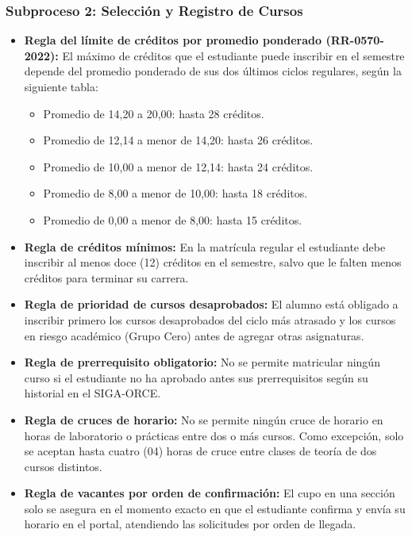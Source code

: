 \subsubsection{Subproceso 2: Selección y Registro de Cursos}

\begin{itemize}
    \item \textbf{Regla del límite de créditos por promedio ponderado (RR-0570-2022):} El máximo de créditos que el estudiante puede inscribir en el semestre depende del promedio ponderado de sus dos últimos ciclos regulares, según la siguiente tabla:
    \begin{itemize}
        \item Promedio de 14,20 a 20,00: hasta 28 créditos.
        \item Promedio de 12,14 a menor de 14,20: hasta 26 créditos.
        \item Promedio de 10,00 a menor de 12,14: hasta 24 créditos.
        \item Promedio de 8,00 a menor de 10,00: hasta 18 créditos.
        \item Promedio de 0,00 a menor de 8,00: hasta 15 créditos.
    \end{itemize}

    \item \textbf{Regla de créditos mínimos:} En la matrícula regular el estudiante debe inscribir al menos doce (12) créditos en el semestre, salvo que le falten menos créditos para terminar su carrera.

    \item \textbf{Regla de prioridad de cursos desaprobados:} El alumno está obligado a inscribir primero los cursos desaprobados del ciclo más atrasado y los cursos en riesgo académico (Grupo Cero) antes de agregar otras asignaturas.

    \item \textbf{Regla de prerrequisito obligatorio:} No se permite matricular ningún curso si el estudiante no ha aprobado antes sus prerrequisitos según su historial en el SIGA-ORCE.

    \item \textbf{Regla de cruces de horario:} No se permite ningún cruce de horario en horas de laboratorio o prácticas entre dos o más cursos. Como excepción, solo se aceptan hasta cuatro (04) horas de cruce entre clases de teoría de dos cursos distintos.

    \item \textbf{Regla de vacantes por orden de confirmación:} El cupo en una sección solo se asegura en el momento exacto en que el estudiante confirma y envía su horario en el portal, atendiendo las solicitudes por orden de llegada.
\end{itemize}
